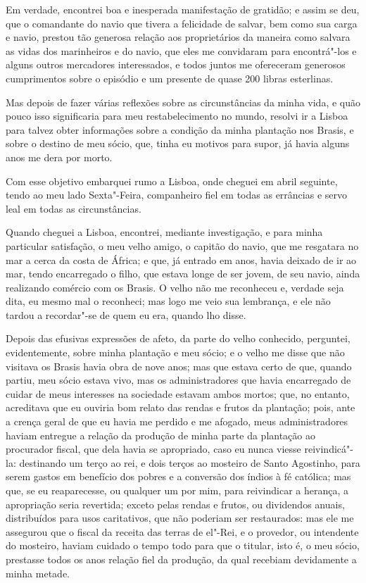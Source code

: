 Em verdade, encontrei boa e inesperada manifestação de gratidão; e assim
se deu, que o comandante do navio que tivera a felicidade de salvar, bem
como sua carga e navio, prestou tão generosa relação aos proprietários
da maneira como salvara as vidas dos marinheiros e do navio, que eles me
convidaram para encontrá"-los e alguns outros mercadores interessados, e
todos juntos me ofereceram generosos cumprimentos sobre o episódio e um
presente de quase 200 libras esterlinas.

Mas depois de fazer várias reflexões sobre as circunstâncias da minha
vida, e quão pouco isso significaria para meu restabelecimento no mundo,
resolvi ir a Lisboa para talvez obter informações sobre a condição da
minha plantação nos Brasis, e sobre o destino de meu sócio, que, tinha
eu motivos para supor, já havia alguns anos me dera por morto.

Com esse objetivo embarquei rumo a Lisboa, onde cheguei em abril
seguinte, tendo ao meu lado Sexta"-Feira, companheiro fiel em todas as
errâncias e servo leal em todas as circunstâncias.

Quando cheguei a Lisboa, encontrei, mediante investigação, e para minha
particular satisfação, o meu velho amigo, o capitão do navio, que me
resgatara no mar a cerca da costa de África; e que, já entrado em anos,
havia deixado de ir ao mar, tendo encarregado o filho, que estava longe
de ser jovem, de seu navio, ainda realizando comércio com os Brasis. O
velho não me reconheceu e, verdade seja dita, eu mesmo mal o reconheci;
mas logo me veio sua lembrança, e ele não tardou a recordar"-se de quem
eu era, quando lho disse.

Depois das efusivas expressões de afeto, da parte do velho conhecido,
perguntei, evidentemente, sobre minha plantação e meu sócio; e o velho
me disse que não visitava os Brasis havia obra de nove anos; mas que
estava certo de que, quando partiu, meu sócio estava vivo, mas os
administradores que havia encarregado de cuidar de meus interesses na
sociedade estavam ambos mortos; que, no entanto, acreditava que eu
ouviria bom relato das rendas e frutos da plantação; pois, ante a crença
geral de que eu havia me perdido e me afogado, meus administradores
haviam entregue a relação da produção de minha parte da plantação ao
procurador fiscal, que dela havia se apropriado, caso eu nunca viesse
reivindicá"-la: destinando um terço ao rei, e dois terços ao mosteiro de
Santo Agostinho, para serem gastos em benefício dos pobres e a conversão
dos índios à fé católica; mas que, se eu reaparecesse, ou qualquer um
por mim, para reivindicar a herança, a apropriação seria revertida;
exceto pelas rendas e frutos, ou dividendos anuais, distribuídos para
usos caritativos, que não poderiam ser restaurados: mas ele me assegurou
que o fiscal da receita das terras de el"-Rei, e o provedor, ou
intendente do mosteiro, haviam cuidado o tempo todo para que o titular,
isto é, o meu sócio, prestasse todos os anos relação fiel da produção,
da qual recebiam devidamente a minha metade.

